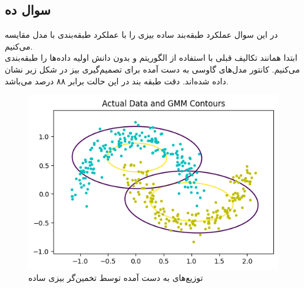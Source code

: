 \documentclass[12pt,onecolumn,a4paper]{article}
\begin{document}
\newpage
\subsection{سوال ده}
در این سوال عملکرد طبقه‌بند ساده بیزی را با عملکرد طبقه‌بندی با مدل  مقایسه می‌کنیم.
\\
ابتدا همانند تکالیف قبلی با استفاده از الگوریتم  و بدون دانش اولیه  داده‌ها را طبقه‌بندی می‌کنیم. کانتور مدل‌های گاوسی به دست آمده برای تصمیم‌گیری بیز در شکل زیر نشان داده شده‌اند. دقت طبقه بند در این حالت برابر ۸۸ درصد می‌باشد.

\begin{figure}[h!]
    \label{fig:4}
    \begin{center}
    \includegraphics[scale=0.6]{q10_bayes.png}
    \caption{توزیع‌های به دست آمده توسط تخمین‌گر بیزی ساده}
    \end{center}
\end{figure}
\end{document}
